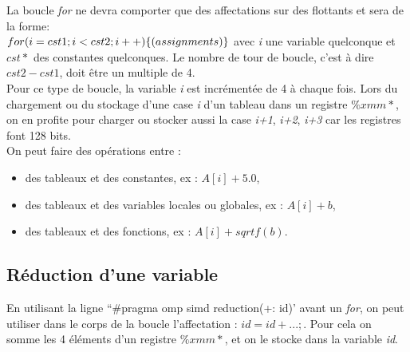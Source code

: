 \documentclass[a4paper,8pt,french,fleqn]{article}
\begin{document}
La boucle \textit{for} ne devra comporter que des affectations sur des flottants et sera de la forme:\\
$for (i=cst1 ; i<cst2 ;i++) \{ \\
(assignments) \\
\}\\$
avec \textit{i} une variable quelconque et $cst*$ des constantes quelconques.
Le nombre de tour de boucle, c'est à dire $cst2 - cst1$, doit être un multiple de 4.\\
Pour ce type de boucle, la variable \textit{i} est incrémentée de 4 à chaque fois. Lors du chargement ou du stockage d'une case \textit{i} d'un tableau dans un registre $\%xmm*$, on en profite pour charger ou stocker aussi la case \textit{i+1}, \textit{i+2}, \textit{i+3} car les registres font 128 bits.\\
On peut faire des opérations entre : 
\begin{itemize}
\item des tableaux et des constantes, ex : $A[i] + 5.0$,
\item des tableaux et des variables locales ou globales, ex : $A[i] + b$,
\item des tableaux et des fonctions, ex : $A[i] + sqrtf(b)$.
\end{itemize}

\subsection{Réduction d'une variable}
En utilisant la ligne ``\#pragma omp simd reduction(+: id)' avant un \textit{for}, on peut utiliser dans le corps de la boucle l'affectation : $id = id + ...;$.
Pour cela on somme les 4 éléments d'un registre $\%xmm*$, et on le stocke dans la variable \textit{id}.
\end{document}
